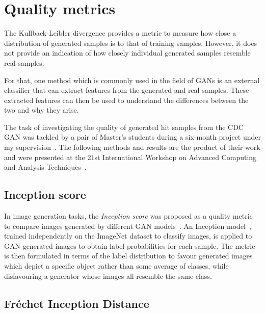 \section{Quality metrics}\label{sec:quality_metrics} %

The Kullback-Leibler divergence provides a metric to measure how close a
distribution of generated samples is to that of training samples. However, it
does not provide an indication of how closely individual generated samples
resemble real samples. 

For that, one method which is commonly used in the field
of GANs is an external classifier that can extract features from the generated
and real samples. These extracted features can then be used to understand the
differences between the two and why they arise.

The task of investigating the quality of generated hit samples from the CDC GAN
was tackled by a pair of Master's students during a six-month project under my
supervision~\cite{noam, irene}. The following methods and results are the
product of their work and were presented at the 21st International Workshop on
Advanced Computing and Analysis Techniques~\cite{acat_poster}.


\subsection{Inception score}

In image generation tasks, the \emph{Inception score} was proposed as a quality
metric to compare images generated by different GAN
models~\cite{salimans_improved_2016}. 
An Inception model~\cite{7298594}, trained independently on the ImageNet dataset
to classify images, is applied to GAN-generated images to obtain label
probabilities for each sample. The metric is then formulated in terms of the label
distribution to favour generated images which depict a specific object rather than
some average of classes, while disfavouring a generator whose images all resemble
the same class.

\subsection{Fréchet Inception Distance}


